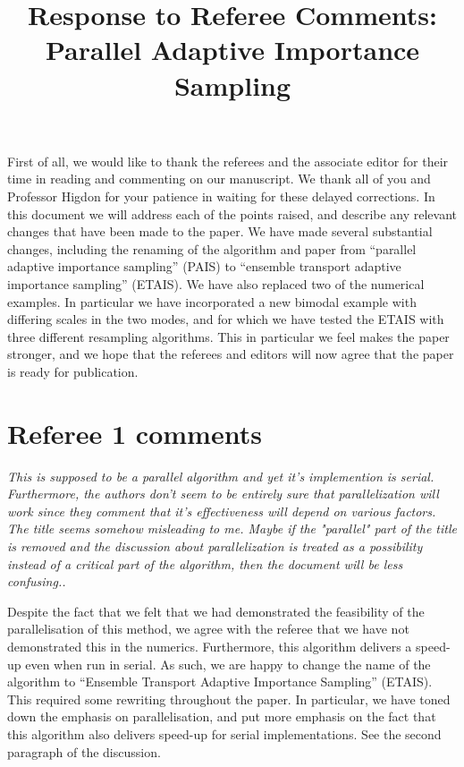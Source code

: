 \documentclass{article}
\newcommand{\comment}[2]{\vspace{0.6cm}{\bf Comment:} {\it #1.}

\vspace{0.3cm}{\bf Answer:} #2}
\begin{document}
\title{Response to Referee Comments: Parallel Adaptive Importance Sampling}
\maketitle
First of all, we would like to thank the referees and the associate editor for
their time in reading and commenting on our manuscript. We thank all of you and Professor Higdon for your patience in waiting for these delayed corrections. In this document
we will address each of the points raised, and describe any relevant
changes that have been made to the paper. We have made several substantial changes, including the renaming of the algorithm and paper from ``parallel adaptive importance sampling'' (PAIS) to ``ensemble transport adaptive importance sampling'' (ETAIS). We have also replaced two of the numerical examples. In particular we have incorporated a new bimodal example with differing scales in the two modes, and for which we have tested the ETAIS with three different resampling algorithms. This in particular we feel makes the paper stronger, and we hope that the referees and editors will now agree that the paper is ready for publication.

\section*{Referee 1 comments}

\comment{This is supposed to be a parallel algorithm and yet it's implemention is serial. Furthermore, the authors don't seem to be entirely sure that parallelization will work since they comment that it's effectiveness will depend on various factors. The title seems somehow misleading to me. Maybe if the "parallel" part of the title is removed and the discussion about parallelization is treated as a possibility instead of a critical part of the algorithm, then the document will be less confusing.}{Despite the fact that we felt that we had demonstrated the feasibility of the parallelisation of this method, we agree with the referee that we have not demonstrated this in the numerics. Furthermore, this algorithm delivers a speed-up even when run in serial. As such, we are happy to change the name of the algorithm to ``Ensemble Transport Adaptive Importance Sampling'' (ETAIS). This required some rewriting throughout the paper. In particular, we have toned down the emphasis on parallelisation, and put more emphasis on the fact that this algorithm also delivers speed-up for serial implementations. See the second paragraph of the discussion.}
\end{document}

